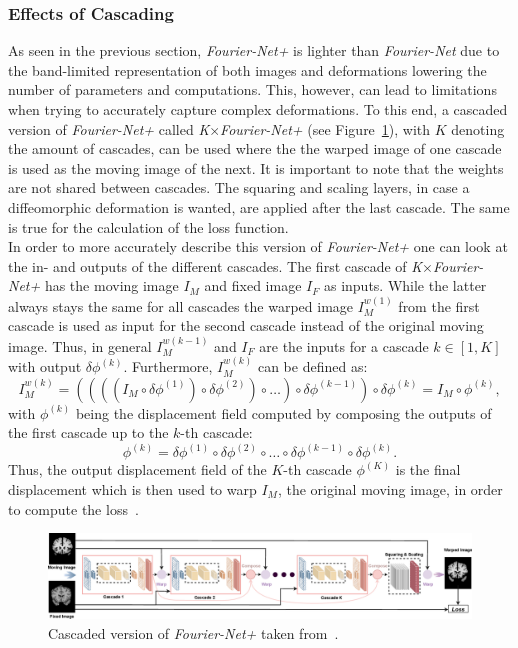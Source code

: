 \documentclass[english,version-2022-01]{uzl-thesis} %
\begin{document}
\subsubsection{Effects of Cascading} \label{SubSubSec:EffectsCascading}
As seen in the previous section, \emph{Fourier-Net+} is lighter than \emph{Fourier-Net} due to the band-limited representation of both images and deformations lowering the number of parameters and computations. This, however, can lead to limitations when trying to accurately capture complex deformations. To this end, a cascaded version of \emph{Fourier-Net+} called \emph{K$\times$Fourier-Net+} (see Figure~\ref{fig:Fourier-Net+Cascaded}), with $K$ denoting the amount of cascades, can be used where the the warped image of one cascade is used as the moving image of the next. It is important to note that the weights are not shared between cascades. The squaring and scaling layers, in case a diffeomorphic deformation is wanted, are applied after the last cascade. The same is true for the calculation of the loss function.\\
In order to more accurately describe this version of \emph{Fourier-Net+} one can look at the in- and outputs of the different cascades. The first cascade of \emph{K$\times$Fourier-Net+} has the moving image $I_M$ and fixed image $I_F$ as inputs. While the latter always stays the same for all cascades the warped image $I_M^{w(1)}$ from the first cascade is used as input for the second cascade instead of the original moving image. Thus, in general $I_M^{w(k-1)}$ and $I_F$ are the inputs for a cascade $k \in [1, K]$ with output $\delta \phi^{(k)}$. Furthermore, $I_M^{w(k)}$ can be defined as:
\begin{equation}
	I_M^{w(k)} = ((((I_M \circ \delta \phi^{(1)}) \circ \delta \phi^{(2)}) \circ \dots ) \circ \delta \phi^{(k-1)}) \circ \delta \phi^{(k)} = I_M \circ  \phi^{(k)},
\end{equation}
with $\phi^{(k)}$ being the displacement field computed by composing the outputs of the first cascade up to the $k$-th cascade:
\begin{equation}
	\phi^{(k)} = \delta \phi^{(1)} \circ \delta \phi^{(2)} \circ \dots \circ \delta \phi^{(k-1)} \circ \delta \phi^{(k)}.
\end{equation}
Thus, the output displacement field of the $K$-th cascade $\phi^{(K)}$ is the final displacement which is then used to warp $I_M$, the original moving image, in order to compute the loss~\cite{Fourier-Net+}.

\begin{figure}[htpb]
	\centering
	\graphicspath{{images/}{\main/images/}}
	\includegraphics[width=\linewidth]{ArchitectureFourier-Net+Cascaded.png} 
	\caption{Cascaded version of \emph{Fourier-Net+} taken from~\cite{Fourier-Net+}.}
	\label{fig:Fourier-Net+Cascaded}
\end{figure}
\end{document}
